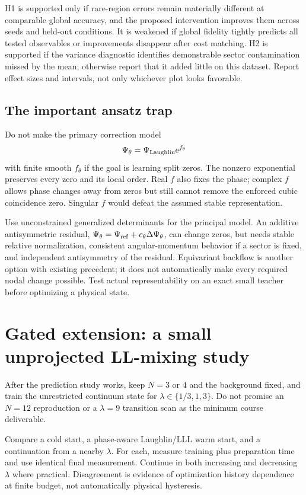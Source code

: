 \documentclass[11pt,letterpaper]{article}
\newcommand{\ee}{\mathrm e}
\begin{document}
H1 is supported only if rare-region errors remain materially different at comparable global accuracy, and the proposed intervention improves them across seeds and held-out conditions. It is weakened if global fidelity tightly predicts all tested observables or improvements disappear after cost matching. H2 is supported if the variance diagnostic identifies demonstrable sector contamination missed by the mean; otherwise report that it added little on this dataset. Report effect sizes and intervals, not only whichever plot looks favorable.

\subsection{The important ansatz trap}

Do not make the primary correction model
\begin{equation}
 \Psi_\theta=\Psi_{\rm Laughlin}\ee^{f_\theta}
 \label{eq:badresidual}
\end{equation}
with finite smooth $f_\theta$ if the goal is learning split zeros. The nonzero exponential preserves every zero and its local order. Real $f$ also fixes the phase; complex $f$ allows phase changes away from zeros but still cannot remove the enforced cubic coincidence zero. Singular $f$ would defeat the assumed stable representation.

Use unconstrained generalized determinants for the principal model. An additive antisymmetric residual, $\Psi_\theta=\Psi_{\rm ref}+c_\theta\Delta\Psi_\theta$, can change zeros, but needs stable relative normalization, consistent angular-momentum behavior if a sector is fixed, and independent antisymmetry of the residual. Equivariant backflow is another option with existing precedent; it does not automatically make every required nodal change possible. Test actual representability on an exact small teacher before optimizing a physical state.

\section{Gated extension: a small unprojected LL-mixing study}
\label{sec:extension}

After the prediction study works, keep $N=3$ or $4$ and the background fixed, and train the unrestricted continuum state for $\lambda\in\{1/3,1,3\}$. Do not promise an $N=12$ reproduction or a $\lambda=9$ transition scan as the minimum course deliverable.

Compare a cold start, a phase-aware Laughlin/LLL warm start, and a continuation from a nearby $\lambda$. For each, measure training plus preparation time and use identical final measurement. Continue in both increasing and decreasing $\lambda$ where practical. Disagreement is evidence of optimization history dependence at finite budget, not automatically physical hysteresis.
\end{document}
